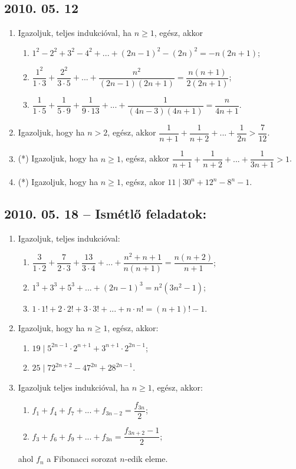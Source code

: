 \documentclass{article}
\newenvironment{abc}{\begin{enumerate}[label=\textit{\alph*})]}{\end{enumerate}}
\begin{document}
\subsection*{2010. 05. 12}
\begin{enumerate}
\item Igazoljuk, teljes indukcióval, ha $n\ge1$, egész, akkor
\begin{abc}
\item $1^{2}-2^{2}+3^{2}-4^{2}+...+(2n-1)^{2}-(2n)^2=-n(2n+1)$;
\item $\dfrac{1^{2}}{1\cdot3}+\dfrac{2^{2}}{3\cdot5}+...+\dfrac{n^{2}}{(2n-1)(2n+1)}=\dfrac{n(n+1)}{2(2n+1)}$;
\item $\dfrac{1}{1\cdot5}+\dfrac{1}{5\cdot9}+\dfrac{1}{9\cdot13}+...+\dfrac{1}{(4n-3)(4n+1)}=\dfrac{n}{4n+1}$.
\end{abc}
\item Igazoljuk, hogy ha $n>2$, egész, akkor
$\dfrac{1}{n+1}+\dfrac{1}{n+2}+...+\dfrac{1}{2n}>\dfrac{7}{12}$.
\item (*) Igazoljuk, hogy ha $n\ge1$, egész, akkor
$\dfrac{1}{n+1}+\dfrac{1}{n+2}+...+\dfrac{1}{3n+1}>1$.
\item (*) Igazoljuk, hogy ha $n\ge1$, egész, akor $11\mid 30^{n}+12^{n}-8^{n}-1$.
\end{enumerate}


\subsection*{2010. 05. 18 -- Ismétlő feladatok:}
\begin{enumerate}
\item Igazoljuk, teljes indukcióval:
\begin{abc}
\item $\dfrac{3}{1\cdot2}+\dfrac{7}{2\cdot3}+\dfrac{13}{3\cdot4}+...+\dfrac{n^{2}+n+1}{n(n+1)}=\dfrac{n(n+2)}{n+1}$;
\item $1^{3}+3^{3}+5^{3}+...+(2n-1)^{3}=n^{2}(3n^{2}-1)$;
\item $1\cdot1!+2\cdot2!+3\cdot3!+...+n\cdot n!=(n+1)!-1$.
\end{abc}
\item Igazoljuk, hogy ha $n\ge1$, egész, akkor:
\begin{abc}
\item $19\mid 5^{2n-1}\cdot2^{n+1}+3^{n+1}\cdot2^{2n-1}$;
\item $25\mid 72^{2n+2}-47^{2n}+28^{2n-1}$.
\end{abc}
\item Igazoljuk teljes indukcióval, ha $n\ge1$, egész, akkor:
\begin{abc}
\item $f_{1}+f_{4}+f_{7}+...+f_{3n-2}=\dfrac{f_{3n}}{2}$;
\item $f_{3}+f_{6}+f_{9}+...+f_{3n}=\dfrac{f_{3n+2}-1}{2}$;
\end{abc}
ahol $f_n$ a Fibonacci sorozat $n$-edik eleme.
\end{enumerate}
\end{document}

